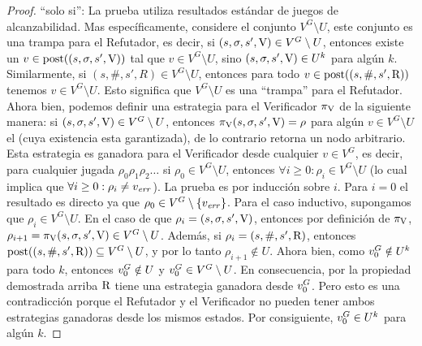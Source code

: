 \begin{proof} 
	``solo si'': La prueba utiliza resultados estándar de juegos de alcanzabilidad. Mas específicamente, considere el conjunto $V^G \setminus U$, este conjunto es una trampa para el Refutador, es decir, si $(s,\sigma, s', \mathrm{V}) \in V^G \setminus U$, entonces existe un $v \in \operatorname{post}((s,\sigma, s', \mathrm{V}))$ tal que 
$v \in V^G \setminus U$, sino
$(s,\sigma, s', \mathrm{V}) \in U^k$ para algún $k$. Similarmente, si $(s,\#, s', R) \in V^G \setminus U$, entonces para todo $v \in \operatorname{post}((s,\#, s', \mathrm{R}))$ 
tenemos $v \in V^G \setminus U$. Esto significa que $V^G \setminus U$ es una ``trampa'' para el Refutador. 
Ahora bien, podemos definir una estrategia para el Verificador $\pi_{\mathrm{V}}$ de la siguiente manera: si $(s, \sigma, s', \mathrm{V}) \in V^G \setminus U$, entonces
$\pi_{\mathrm{V}}(s, \sigma, s', \mathrm{V}) = \rho$ para algún $v \in V^G \setminus U$ el (cuya existencia esta garantizada), de lo contrario retorna un nodo arbitrario. 
Esta estrategia es ganadora para el Verificador desde cualquier $v \in V^G$, es decir, para cualquier jugada $\rho_0 \rho_1 \rho_2 \dots$ 
si $\rho_0 \in V^G \setminus U$, entonces $\forall i \geq 0: \rho_i \in V^G \setminus U$ 
(lo cual implica que $\forall i \geq 0: \rho_i \neq v_{\mathit{err}}$). 
La prueba es por inducción sobre $i$. Para $i=0$ el resultado es directo ya que $\rho_0 \in V^G \setminus \{v_{\mathit{err}}\}$. Para el caso inductivo,
supongamos que $\rho_i \in V^G \setminus U$. En el caso de que $\rho_i = (s, \sigma, s', \mathrm{V})$, entonces por definición de $\pi_{\mathrm{V}}$, 
$\rho_{i+1} = \pi_{\mathrm{V}}(s,\sigma, s', \mathrm{V}) \in V^G \setminus U$.
Además, si $\rho_i = (s, \#, s', \mathrm{R})$, entonces $\operatorname{post}((s, \#, s', \mathrm{R})) \subseteq V^G \setminus U$, 
y por lo tanto $\rho_{i+1} \notin U$. 
Ahora bien, como $v_0^G \notin U^k$ para todo $k$, entonces $v_0^G \notin U$ y $v_0^G \in V^G \setminus U$. 
En consecuencia, por la propiedad demostrada arriba $\mathrm{R}$ tiene una estrategia ganadora desde 
$v_0^G$. Pero esto es una contradicción porque el Refutador y el Verificador no pueden tener ambos estrategias ganadoras desde los mismos estados.
Por consiguiente, $v_0^G \in U^k$ para algún $k$.
	

\end{proof}

